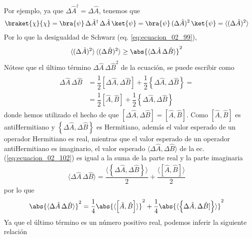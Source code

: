 Por ejemplo, ya que $\Delta \hat{A}^{\dagger} = \Delta \hat{A}$, tenemos que
\begin{align*}
\braket{\chi}{\chi} = \bra{\psi} \, \Delta \hat{A}^{\dagger} \, \Delta \hat{A} \, \ket{\psi} = \bra{\psi} \, (\Delta \hat{A})^{2} \, \ket{\psi} = \langle (\Delta \hat{A})^{2} \rangle
\end{align*}
Por lo que la desigualdad de Schwarz (eq. \ref{eq:ecuacion_02_99}),
\begin{align}
\langle (\Delta \hat{A})^{2} \rangle \, \langle (\Delta \hat{B})^{2} \rangle \geq \abs{\langle \Delta \hat{A} \, \Delta \hat{B}\rangle}^{2} 
\label{eq:ecuacion_02_101}
\end{align}
Nótese que el último término $\Delta \hat{A} \, \Delta \hat{B}^{2}$ de la ecuación, se puede escribir como
\begin{align}
\begin{aligned}
\Delta \hat{A} \, \Delta \hat{B} &= \dfrac{1}{2} \left[ \Delta \hat{A} , \Delta \hat{B} \right] + \dfrac{1}{2} \left\{ \Delta \hat{A} , \Delta \hat{B} \right\} = \\[0.5em]
&= \dfrac{1}{2}  \left[ \hat{A} , \hat{B} \right] + \dfrac{1}{2} \left\{ \Delta \hat{A} , \Delta \hat{B} \right\}
\end{aligned}
\label{eq:ecuacion_02_102}
\end{align}
donde hemos utilizado el hecho de que $[\Delta \hat{A},\Delta \hat{B}]= [\hat{A}, \hat{B}]$. Como $[\hat{A}, \hat{B}]$ es antiHermitiano y $\left\{ \Delta \hat{A},\Delta \hat{B} \right\}$ es Hermitiano, además el valor esperado de un operador Hermitiano es real, mientras que el valor esperado de un operador antiHermitiano es imaginario, el valor esperado $\langle \Delta \hat{A}, \Delta \hat{B} \rangle$ de la ec. (\ref{eq:ecuacion_02_102}) es igual a la suma de la parte real y la parte imaginaria
\begin{align*}
\langle \Delta \hat{A} \, \Delta \hat{B} \rangle = \dfrac{\langle \left\{ \Delta \hat{A},\Delta \hat{B} \right\} \rangle}{2} + \dfrac{\langle [\hat{A}, \hat{B}] \rangle}{2}
\end{align*}
por lo que
\begin{align}
\abs{ \langle \Delta \hat{A} \, \Delta \hat{B} \rangle}^{2} = \dfrac{1}{4} \abs{\langle \left[ \hat{A}, \hat{B} \right] \rangle}^{2} + \dfrac{1}{4} \abs{ \langle \left\{ \Delta \hat{A}, \Delta \hat{B}] \right\} \rangle}^{2}
\label{eq:ecuacion_02_103}
\end{align}
Ya que el último término es un número positivo real, podemos inferir la siguiente relación
